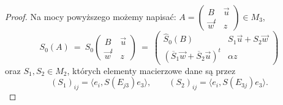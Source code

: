 {\begin{proof}
Na mocy powyższego możemy napisać:
$A  =   \left( \begin{smallmatrix}
    B & \vec{u} \\
    \vec{w}^{t} & z
    \end{smallmatrix} \right) \in M_{3}$,
\begin{equation}
    S_{0}(A) \:=\: S_{0} \begin{pmatrix}
    B & \vec{u} \\
    \vec{w}^{t} & z
    \end{pmatrix} \: = \:
    \begin{pmatrix}
        \hat{S}_{0}(B) & S_{1} \vec{u} + S_{2} \vec{w} \\
        (\overline{S}_{1} \vec{w} + \overline{S}_{2} \vec{u})^{t} & \alpha z
    \end{pmatrix}
\end{equation}
oraz  $S_{1}, S_{2} \in M_{2}$, których elementy macierzowe dane są przez
\begin{equation}
(S_{1})_{ij} = \langle e_{i}, S(E_{j3}) e_{3} \rangle, \quad \quad
(S_{2})_{ij} = \langle e_{i}, S(E_{3j}) e_{3} \rangle.
\end{equation}


\end{proof}}
